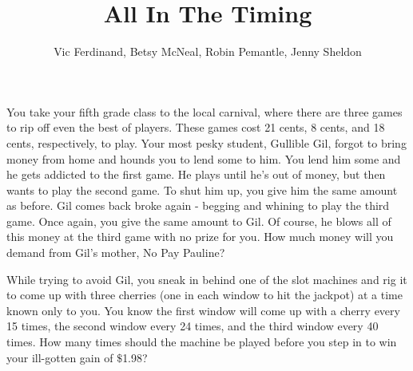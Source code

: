 \documentclass[nooutcomes]{ximera}
\title{All In The Timing}
\author{Vic Ferdinand, Betsy McNeal, Robin Pemantle, Jenny Sheldon}
\begin{document}
\begin{abstract} \end{abstract}
\maketitle



\begin{problem}
 You take your fifth grade class to the local carnival, where there are three games to rip off even the best of players.  These games cost 21 cents, 8 cents, and 18 cents, respectively, to play.  Your most pesky student, Gullible Gil, forgot to bring money from home and hounds you to lend some to him.  You lend him some and he gets addicted to the first game.  He plays until he's out of money, but then wants to play the second game.  To shut him up, you give him the same amount as before.  Gil comes back broke again - begging and whining to play the third game.  Once again, you give the same amount to Gil.  Of course, he blows all of this money at the third game with no prize for you.  How much money will you demand from Gil's mother, No Pay Pauline?
\end{problem}

\begin{problem}
 While trying to avoid Gil, you sneak in behind one of the slot machines and rig it to come up with three cherries (one in each window to hit the jackpot) at a time known only to you. You know the first window will come up with a cherry every 15 times, the second window every 24 times, and the third window every 40 times.  How many times should the machine be played before you step in to win your ill-gotten gain of $\$$1.98?

\end{problem}
\end{document}
